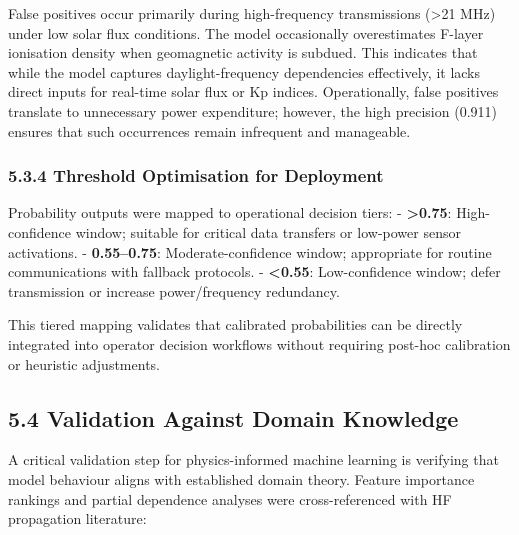 False positives occur primarily during high-frequency transmissions
(\textgreater21 MHz) under low solar flux conditions. The model
occasionally overestimates F-layer ionisation density when geomagnetic
activity is subdued. This indicates that while the model captures
daylight-frequency dependencies effectively, it lacks direct inputs for
real-time solar flux or Kp indices. Operationally, false positives
translate to unnecessary power expenditure; however, the high precision
(0.911) ensures that such occurrences remain infrequent and manageable.

\subsubsection{5.3.4 Threshold Optimisation for
Deployment}\label{threshold-optimisation-for-deployment}

Probability outputs were mapped to operational decision tiers: -
\textbf{\textgreater0.75}: High-confidence window; suitable for critical
data transfers or low-power sensor activations. - \textbf{0.55--0.75}:
Moderate-confidence window; appropriate for routine communications with
fallback protocols. - \textbf{\textless0.55}: Low-confidence window;
defer transmission or increase power/frequency redundancy.

This tiered mapping validates that calibrated probabilities can be
directly integrated into operator decision workflows without requiring
post-hoc calibration or heuristic adjustments.

\subsection{5.4 Validation Against Domain
Knowledge}\label{validation-against-domain-knowledge}

A critical validation step for physics-informed machine learning is
verifying that model behaviour aligns with established domain theory.
Feature importance rankings and partial dependence analyses were
cross-referenced with HF propagation literature:

